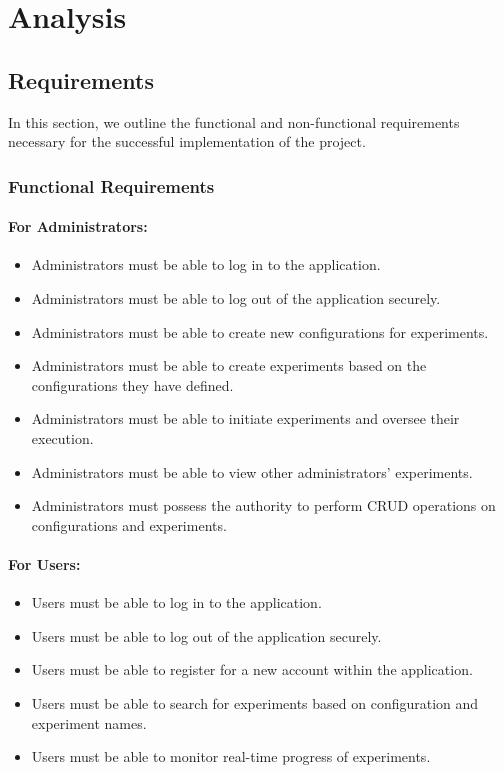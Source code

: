 \chapter{Analysis}

\section{Requirements}

In this section, we outline the functional and non-functional requirements necessary for the successful implementation of the project.

\subsection{Functional Requirements}

\subsubsection{For Administrators:}

\begin{itemize}
    \item Administrators must be able to log in to the application.
    \item Administrators must be able to log out of the application securely.
    \item Administrators must be able to create new configurations for experiments.
    \item Administrators must be able to create experiments based on the configurations they have defined.
    \item Administrators must be able to initiate experiments and oversee their execution.
    \item Administrators must be able to view other administrators' experiments.
    \item Administrators must possess the authority to perform CRUD operations on configurations and experiments.
\end{itemize}

\subsubsection{For Users:}

\begin{itemize}
    \item Users must be able to log in to the application.
    \item Users must be able to log out of the application securely.
    \item Users must be able to register for a new account within the application.
    \item Users must be able to search for experiments based on configuration and experiment names.
    \item Users must be able to monitor real-time progress of experiments.
\end{itemize}

